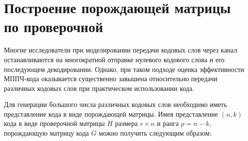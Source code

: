 \section{Построение порождающей матрицы по проверочной}

Многие исследователи при моделировании передачи кодовых слов через канал останавливаются на многократной отправке
нулевого кодового слова и его последующем декодировании. Однако, при таком подходе оценка эффективности
МППЧ-кода оказывается существенно завышена относительно передачи различных кодовых слов при практическом использовании
кода.

Для генерации большого числа различных кодовых слов необходимо иметь представление кода в виде
 порождающей матрицы. Имея представление $(n,k)$ кода в виде проверочной матрицы $H$ размера $r \times n$ и
 ранга $p=n-k$, порождающую матрицу кода $G$ можно получить следующим образом:
